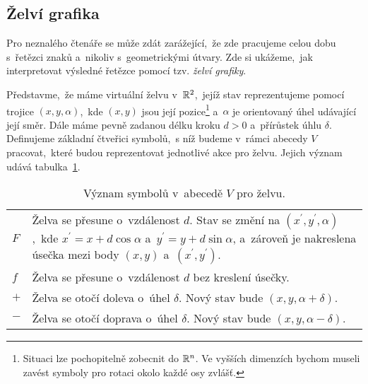 \subsection{Želví grafika}\label{subsec:zelvi-grafika}

Pro neznalého čtenáře se může zdát zarážející,~že zde pracujeme celou dobu s~řetězci znaků a~nikoliv s~geometrickými útvary. Zde si ukážeme,~jak interpretovat výsledné řetězce pomocí tzv. \emph{želví grafiky}.

Představme,~že máme virtuální želvu v~$\mathbb{R}^2$,~jejíž stav reprezentujeme pomocí trojice $(x,y,\alpha)$,~kde $(x,y)$ jsou její pozice\footnote{Situaci lze pochopitelně zobecnit do $\mathbb{R}^n$. Ve vyšších dimenzích bychom museli zavést symboly pro rotaci okolo každé osy zvlášť.} a~$\alpha$ je orientovaný úhel udávající její směr. Dále máme pevně zadanou délku kroku $d>0$ a~přírůstek úhlu $\delta$. Definujeme základní čtveřici symbolů,~s níž budeme v~rámci abecedy $V$ pracovat,~které budou reprezentovat jednotlivé akce pro želvu. Jejich význam udává tabulka~\ref{table:vyznam-symbolu-zelva}.
\begin{table}[h]
    \centering
    \begin{tabular}{lp{}}
        $F$ & Želva se přesune o~vzdálenost $d$. Stav se změní na $(x^\prime,y^\prime,\alpha)$,~kde $x^\prime=x+d\cos\alpha$ a~$y^\prime=y+d\sin\alpha$, a~zároveň je nakreslena úsečka mezi body $(x,y)$ a~$(x^\prime,y^\prime)$.\\
        $f$ & Želva se přesune o~vzdálenost $d$ bez kreslení úsečky.\\
        $+$ & Želva se otočí doleva o~úhel $\delta$. Nový stav bude $(x,y,\alpha+\delta)$.\\
        $-$ & Želva se otočí doprava o~úhel $\delta$. Nový stav bude $(x,y,\alpha-\delta)$.
    \end{tabular}
    \caption{Význam symbolů v~abecedě $V$ pro želvu.}
    \label{table:vyznam-symbolu-zelva}
\end{table}

